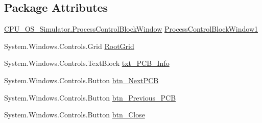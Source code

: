 \subsection*{Package Attributes}
\begin{DoxyCompactItemize}
\item 
\hyperlink{class_c_p_u___o_s___simulator_1_1_process_control_block_window}{C\+P\+U\+\_\+\+O\+S\+\_\+\+Simulator.\+Process\+Control\+Block\+Window} \hyperlink{class_c_p_u___o_s___simulator_1_1_process_control_block_window_a0f63765fb81d298b85ac605be61d06ca}{Process\+Control\+Block\+Window1}
\item 
System.\+Windows.\+Controls.\+Grid \hyperlink{class_c_p_u___o_s___simulator_1_1_process_control_block_window_a415616dfc791b692ef6f5736fd6aeae4}{Root\+Grid}
\item 
System.\+Windows.\+Controls.\+Text\+Block \hyperlink{class_c_p_u___o_s___simulator_1_1_process_control_block_window_af88f289c3eba55631106b52e491fa137}{txt\+\_\+\+P\+C\+B\+\_\+\+Info}
\item 
System.\+Windows.\+Controls.\+Button \hyperlink{class_c_p_u___o_s___simulator_1_1_process_control_block_window_a5cdb1a1e4c4351ab1c153309cd15969e}{btn\+\_\+\+Next\+P\+C\+B}
\item 
System.\+Windows.\+Controls.\+Button \hyperlink{class_c_p_u___o_s___simulator_1_1_process_control_block_window_af25ab71dad636514e08f3e8839b04727}{btn\+\_\+\+Previous\+\_\+\+P\+C\+B}
\item 
System.\+Windows.\+Controls.\+Button \hyperlink{class_c_p_u___o_s___simulator_1_1_process_control_block_window_abbfd6b98c1cf8a76437639b1b43859e3}{btn\+\_\+\+Close}
\end{DoxyCompactItemize}
